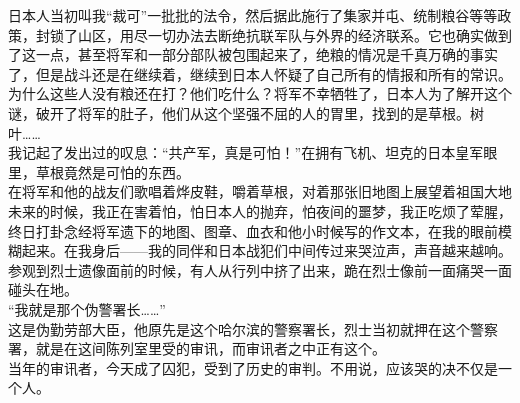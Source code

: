 日本人当初叫我“裁可”一批批的法令，然后据此施行了集家并屯、统制粮谷等等政策，封锁了山区，用尽一切办法去断绝抗联军队与外界的经济联系。它也确实做到了这一点，甚至将军和一部分部队被包围起来了，绝粮的情况是千真万确的事实了，但是战斗还是在继续着，继续到日本人怀疑了自己所有的情报和所有的常识。为什么这些人没有粮还在打？他们吃什么？将军不幸牺牲了，日本人为了解开这个谜，破开了将军的肚子，他们从这个坚强不屈的人的胃里，找到的是草根。树叶……\\

我记起了发出过的叹息：“共产军，真是可怕！”在拥有飞机、坦克的日本皇军眼里，草根竟然是可怕的东西。\\

在将军和他的战友们歌唱着烨皮鞋，嚼着草根，对着那张旧地图上展望着祖国大地未来的时候，我正在害着怕，怕日本人的抛弃，怕夜间的噩梦，我正吃烦了荤腥，终日打卦念经将军遗下的地图、图章、血衣和他小时候写的作文本，在我的眼前模糊起来。在我身后——我的同伴和日本战犯们中间传过来哭泣声，声音越来越响。参观到烈士遗像面前的时候，有人从行列中挤了出来，跪在烈士像前一面痛哭一面碰头在地。\\

“我就是那个伪警署长……”\\

这是伪勤劳部大臣，他原先是这个哈尔滨的警察署长，烈士当初就押在这个警察署，就是在这间陈列室里受的审讯，而审讯者之中正有这个。\\

当年的审讯者，今天成了囚犯，受到了历史的审判。不用说，应该哭的决不仅是一个人。
